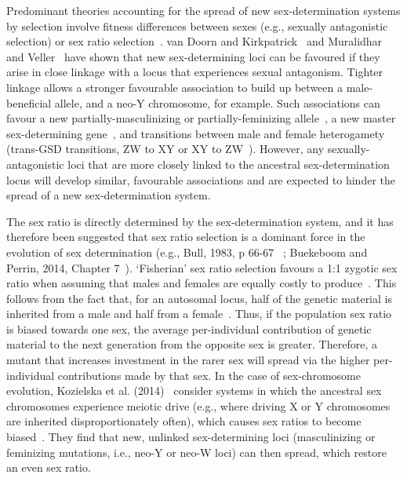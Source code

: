 \documentclass[10pt,letterpaper]{article}
\begin{document}
Predominant theories accounting for the spread of new sex-determination systems by selection involve fitness differences between sexes (e.g., sexually antagonistic selection) or sex ratio selection~\cite{Blaser2012, Beukeboom:2014vb,vanDoorn2014re}. 
van Doorn and Kirkpatrick~\cite{vanDoorn:2007eu,vanDoorn:2010hu} and Muralidhar and Veller~\cite{Muralidhar2018} have shown that new sex-determining loci can be favoured if they arise in close linkage with a locus that experiences sexual antagonism. 
Tighter linkage allows a stronger favourable association to build up between a male-beneficial allele, and a neo-Y chromosome, for example. 
Such associations can favour a new partially-masculinizing or partially-feminizing allele~\cite{Muralidhar2018}, a new master sex-determining gene~\cite{vanDoorn:2007eu}, and transitions between male and female heterogamety (trans-GSD transitions, ZW to XY or XY to ZW~\cite{vanDoorn:2010hu}). 
However, any sexually-antagonistic loci that are more closely linked to the ancestral sex-determination locus will develop similar, favourable associations and are expected to hinder the spread of a new sex-determination system. 

The sex ratio is directly determined by the sex-determination system, and it has therefore been suggested that sex ratio selection is a dominant force in the evolution of sex determination (e.g., Bull, 1983, p 66-67 ~\cite{Bull:1983vi}; Buekeboom and Perrin, 2014, Chapter 7~\cite{Beukeboom:2014vb}). 
`Fisherian' sex ratio selection favours a 1:1 zygotic sex ratio when assuming that males and females are equally costly to produce~\cite{Fisher:1930wy,Charnov:1982wg}.
This follows from the fact that, for an autosomal locus, half of the genetic material is inherited from a male and half from a female~\cite{West:2009we}. 
Thus, if the population sex ratio is biased towards one sex, the average per-individual contribution of genetic material to the next generation from the opposite sex is greater. 
Therefore, a mutant that increases investment in the rarer sex will spread via the higher per-individual contributions made by that sex. 
In the case of sex-chromosome evolution, Kozielska et al. (2014)~\cite{Kozielska:2010vm} consider systems in which the ancestral sex chromosomes experience meiotic drive (e.g., where driving X or Y chromosomes are inherited disproportionately often), which causes sex ratios to become biased~\cite{Hamilton:1967ts}. 
They find that new, unlinked sex-determining loci (masculinizing or feminizing mutations, i.e., neo-Y or neo-W loci) can then spread, which restore an even sex ratio. 
\end{document}

